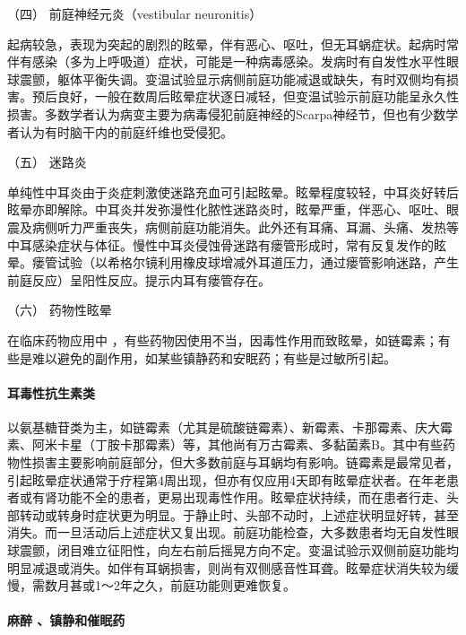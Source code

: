 \hypertarget{text00012.htmlux5cux23CHP1-3-2-6-4}{}
（四） 前庭神经元炎（vestibular neuronitis）

起病较急，表现为突起的剧烈的眩晕，伴有恶心、呕吐，但无耳蜗症状。起病时常伴有感染（多为上呼吸道）症状，可能是一种病毒感染。发病时有自发性水平性眼球震颤，躯体平衡失调。变温试验显示病侧前庭功能减退或缺失，有时双侧均有损害。预后良好，一般在数周后眩晕症状逐日减轻，但变温试验示前庭功能呈永久性损害。多数学者认为病变主要为病毒侵犯前庭神经的Scarpa神经节，但也有少数学者认为有时脑干内的前庭纤维也受侵犯。

\hypertarget{text00012.htmlux5cux23CHP1-3-2-6-5}{}
（五） 迷路炎

单纯性中耳炎由于炎症刺激使迷路充血可引起眩晕。眩晕程度较轻，中耳炎好转后眩晕亦即解除。中耳炎并发弥漫性化脓性迷路炎时，眩晕严重，伴恶心、呕吐、眼震及病侧听力严重丧失，病侧前庭功能消失。此外还有耳痛、耳漏、头痛、发热等中耳感染症状与体征。慢性中耳炎侵蚀骨迷路有瘘管形成时，常有反复发作的眩晕。瘘管试验（以希格尔镜利用橡皮球增减外耳道压力，通过瘘管影响迷路，产生前庭反应）呈阳性反应。提示内耳有瘘管存在。

\hypertarget{text00012.htmlux5cux23CHP1-3-2-6-6}{}
（六） 药物性眩晕

在临床药物应用中
，有些药物因使用不当，因毒性作用而致眩晕，如链霉素；有些是难以避免的副作用，如某些镇静药和安眠药；有些是过敏所引起。

\paragraph{耳毒性抗生素类}

以氨基糖苷类为主，如链霉素（尤其是硫酸链霉素）、新霉素、卡那霉素、庆大霉素、阿米卡星（丁胺卡那霉素）等，其他尚有万古霉素、多黏菌素B。其中有些药物性损害主要影响前庭部分，但大多数前庭与耳蜗均有影响。链霉素是最常见者，引起眩晕症状通常于疗程第4周出现，但亦有仅应用4天即有眩晕症状者。在年老患者或有肾功能不全的患者，更易出现毒性作用。眩晕症状持续，而在患者行走、头部转动或转身时症状更为明显。于静止时、头部不动时，上述症状明显好转，甚至消失。而一旦活动后上述症状又复出现。前庭功能检查，大多数患者均无自发性眼球震颤，闭目难立征阳性，向左右前后摇晃方向不定。变温试验示双侧前庭功能均明显减退或消失。如伴有耳蜗损害，则尚有双侧感音性耳聋。眩晕症状消失较为缓慢，需数月甚或1～2年之久，前庭功能则更难恢复。

\paragraph{麻醉 、镇静和催眠药}

